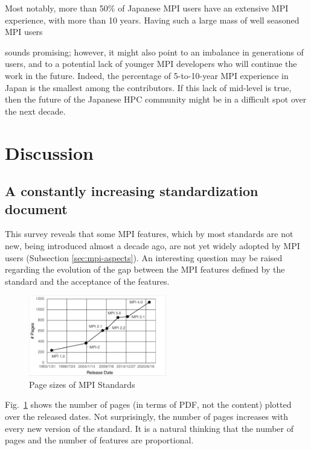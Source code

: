 \documentclass[preprint,5p,times]{elsarticle}
\newcommand{\revision}[2]{{\color{blue}#2}}
\def\countries{contributors\xspace{}}%
\begin{document}
Most notably, more than 50\% of Japanese MPI users have an extensive MPI
experience, with more than 10 years. Having such a large mass of well seasoned
MPI users {\revision{sound}{sounds} promising; however, it might also point to an imbalance in
generations of users, and to a potential lack of younger MPI developers who
will continue the work in the future.
Indeed, the percentage of 5-to-10-year MPI experience in Japan is the smallest
among the \countries. If this lack of mid-level is true, then the
future of \revision{}{the}
Japanese HPC community might be in a difficult spot over the next decade.

\section{Discussion}

\subsection{A constantly increasing standardization document}

This survey reveals that some MPI features, which by most standards are not new,
being introduced almost a decade ago, are not yet widely adopted by MPI users
(Subsection \ref{sec:mpi-aspects}). An interesting question may be raised
regarding the evolution of the gap between the MPI features defined by the
standard and the acceptance of the features.

\begin{figure}[tb]
\begin{center}
\includegraphics[width=6cm]{Figs/MPI-Standards.pdf}
\vspace{-1.5mm}
\caption{Page sizes of MPI Standards}
\label{fig:mpi-standards}
\vspace{-3mm}%
\end{center}
\end{figure}

Fig.~\ref{fig:mpi-standards} shows the number of pages (in terms of PDF, not the
content) plotted over the released dates. Not surprisingly, the number of pages
increases with every new version of the standard. It is a natural thinking that
the number of pages and the number of features are proportional.

}
\end{document}
